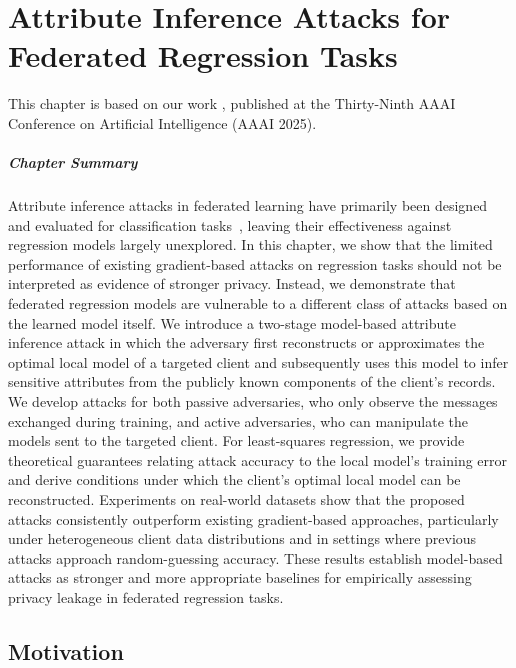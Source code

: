 
\chapter{Attribute Inference Attacks for Federated Regression Tasks}\label{chap:aia}

This chapter is based on our work , published at the Thirty-Ninth AAAI Conference on Artificial Intelligence (AAAI 2025).

\paragraph{Chapter Summary}
Attribute inference attacks in federated learning have primarily been designed and evaluated for classification tasks~\cite{lyu2021novelattributereconstructionattack, chen2024practical}, leaving their effectiveness against regression models largely unexplored. In this chapter, we show that the limited performance of existing gradient-based attacks on regression tasks should not be interpreted as evidence of stronger privacy. Instead, we demonstrate that federated regression models are vulnerable to a different class of attacks based on the learned model itself. We introduce a two-stage model-based attribute inference attack in which the adversary first reconstructs or approximates the optimal local model of a targeted client and subsequently uses this model to infer sensitive attributes from the publicly known components of the client’s records. We develop attacks for both passive adversaries, who only observe the messages exchanged during training, and active adversaries, who can manipulate the models sent to the targeted client. For least-squares regression, we provide theoretical guarantees relating attack accuracy to the local model’s training error and derive conditions under which the client’s optimal local model can be reconstructed. Experiments on real-world datasets show that the proposed attacks consistently outperform existing gradient-based approaches, particularly under heterogeneous client data distributions and in settings where previous attacks approach random-guessing accuracy. These results establish model-based attacks as stronger and more appropriate baselines for empirically assessing privacy leakage in federated regression tasks.
\section{Motivation}

